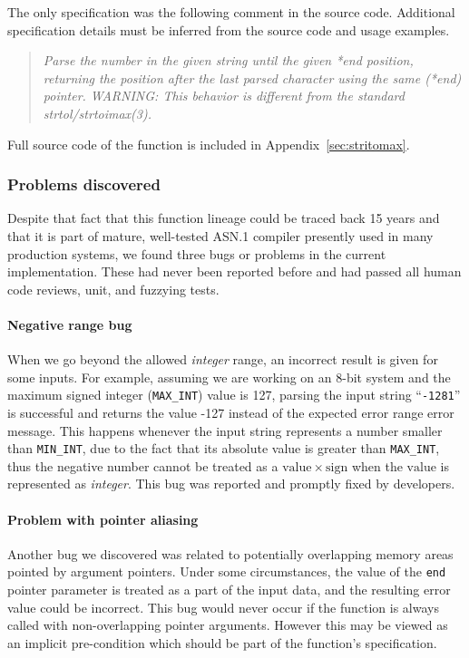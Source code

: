 \documentclass[10p,conference]{IEEEtran}
\begin{document}
The only specification was the following comment in the
source code. Additional specification details must be inferred from
the source code and usage examples.

\begin{quote}
 { \it Parse the number in the given string until the given *end position,
 returning the position after the last parsed character using the
 same (*end) pointer.
 WARNING: This behavior is different from the standard strtol/strtoimax(3). }
\end{quote}

Full source code of the function is included in Appendix~\ref{sec:stritomax}.

\subsubsection{Problems discovered}

Despite that fact that this function lineage could be traced back 15
years and that it is part of mature, well-tested ASN.1 compiler presently used
in many production systems, we
found three bugs or problems in the current implementation. These had
never been reported before and had passed all human code reviews, unit, and
fuzzying tests.
  
\paragraph{Negative range bug}

When we go beyond the allowed \textit{integer} range, an incorrect result is given
for some inputs. For example, assuming we are working on an 8-bit
system and the maximum signed integer (\texttt{MAX\_INT}) value is 127, parsing the input
string ``\texttt{-1281}'' is successful and returns the value -127 instead of the expected error range error message. This happens whenever the input
string represents a number smaller than \texttt{MIN\_INT}, due to the
fact that its absolute value is greater than
\texttt{MAX\_INT}, thus the negative number cannot be treated as a
$\mathrm{value}\times\mathrm{sign}$ when the $\mathrm{value}$ is
represented as \textit{integer}. This bug was reported and promptly fixed by
developers.

\paragraph{Problem with pointer aliasing}

Another bug we discovered was related to potentially overlapping
memory areas pointed by argument pointers. Under some circumstances,
the value of the \texttt{end} pointer parameter is treated as a part
of the input data, and the resulting error value could be
incorrect. This bug would never occur if the function is always called
with non-overlapping pointer arguments. However this may be viewed
as an implicit pre-condition which should be part of the function's
specification.
\end{document}
